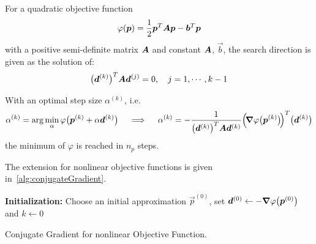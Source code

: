 			For a quadratic objective function
			\begin{align*}
				\varphi(\bm{p}) = \frac{1}{2} \bm{p}^T \bm{A} \bm{p} - \bm{b}^T \bm{p}
			\end{align*}
			with a positive semi-definite matrix \(\bm{A}\) and constant \(\bm{A}\), \(\vec{b}\), the search direction is given as the solution of:
			\begin{align*}
				\big(\bm{d}^{(k)}\big)^T \bm{A} \bm{d}^{(j)} = 0,\quad j = 1, \cdots, k - 1
			\end{align*}

			With an optimal step size \( \alpha^{(k)} \), i.e.
			\begin{align*}
				\alpha^{(k)} = \arg\min_{\alpha} \varphi\big( \bm{p}^{(k)} + \alpha \bm{d}^{(k)} \big)
				\quad\implies\quad \alpha^{(k)} = -\frac{1}{\big(\bm{d}^{(k)}\big)^T \bm{A} \bm{d}^{(k)}} \Big(\! \grad{\varphi}\big(\bm{p}^{(k)}\big) \!\Big)^T \big(\bm{d}^{(k)}\big)
			\end{align*}
			the minimum of \(\varphi\) is reached in \(n_p\) steps.

			The extension for nonlinear objective functions is given in~\autoref{alg:conjugateGradient}.

			\begin{algorithm}  \DontPrintSemicolon
				\textbf{Initialization:} Choose an initial approximation \(\vec{p}^{(0)}\), set \( \bm{d}^{(0)} \gets -\grad{\varphi}\big(\bm{p}^{(0)}\big) \) and \( k \gets 0 \) \;

				\caption{Conjugate Gradient for nonlinear Objective Function.}
				\label{alg:conjugateGradient}
			\end{algorithm}

